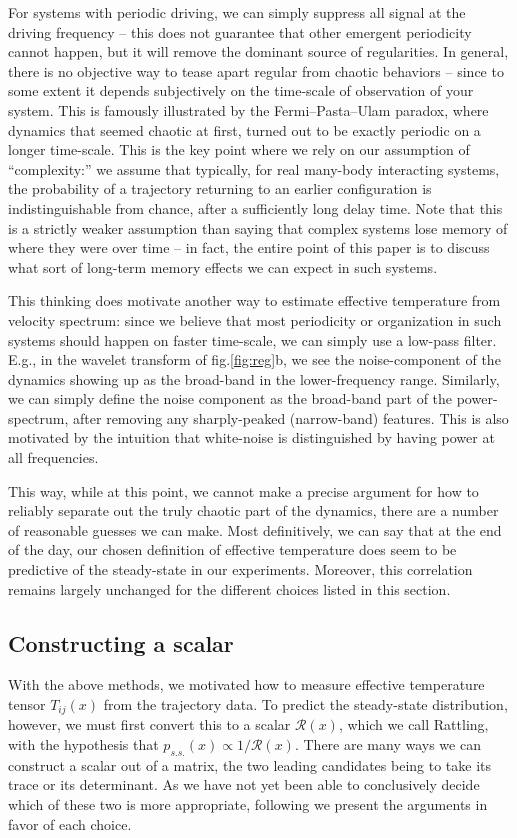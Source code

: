 \documentclass[reprint,prx]{revtex4-1}
\renewcommand{\=}[1]{\stackrel{#1}{=}} %
\renewcommand{\(}{\left (}
\renewcommand{\)}{\right  )}
\renewcommand{\[}{\left [}
\renewcommand{\]}{\right ]}
\newcommand{\<}{\left <}
\renewcommand{\>}{\right >}
\theoremstyle{definition}
\theoremstyle{remark}
\begin{document}
For systems with periodic driving, we can simply suppress all signal at the driving frequency -- this does not guarantee that other emergent periodicity cannot happen, but it will remove the dominant source of regularities. In general, there is no objective way to tease apart regular from chaotic behaviors -- since to some extent it depends subjectively on the time-scale of observation of your system.  This is famously illustrated by the Fermi–Pasta–Ulam paradox, where dynamics that seemed chaotic at first, turned out to be exactly periodic on a longer time-scale. This is the key point where we rely on our assumption of ``complexity:'' we assume that typically, for real many-body interacting systems, the probability of a trajectory returning to an earlier configuration is indistinguishable from chance, after a sufficiently long delay time. Note that this is a strictly weaker assumption than saying that complex systems lose memory of where they were over time -- in fact, the entire point of this paper is to discuss what sort of long-term memory effects we can expect in such systems. 

This thinking does motivate another way to estimate effective temperature from velocity spectrum: since we believe that most periodicity or organization in such systems should happen on faster time-scale, we can simply use a low-pass filter. E.g., in the wavelet transform of fig.\ref{fig:reg}b, we see the noise-component of the dynamics showing up as the broad-band in the lower-frequency range. Similarly, we can simply define the noise component as the broad-band part of the power-spectrum, after removing any sharply-peaked (narrow-band) features. This is also motivated by the intuition that white-noise is distinguished by having power at all frequencies. 

This way, while at this point, we cannot make a precise argument for how to reliably separate out the truly chaotic part of the dynamics, there are a number of reasonable guesses we can make. Most definitively, we can say that at the end of the day, our chosen definition of effective temperature does seem to be predictive of the steady-state in our experiments. Moreover, this correlation remains largely unchanged for the different choices listed in this section. 

\subsection{Constructing a scalar}

With the above methods, we motivated how to measure effective temperature tensor $ T_{ij}(x) $ from the trajectory data. To predict the steady-state distribution, however, we must first convert this to a scalar $ \mathcal{R}(x) $, which we call Rattling, with the hypothesis that $ p_{s.s.}(x)\propto 1/\mathcal{R}(x) $. There are many ways we can construct a scalar out of a matrix, the two leading candidates being to take its trace or its determinant. As we have not yet been able to conclusively decide which of these two is more appropriate, following we present the arguments in favor of each choice.
\end{document}
